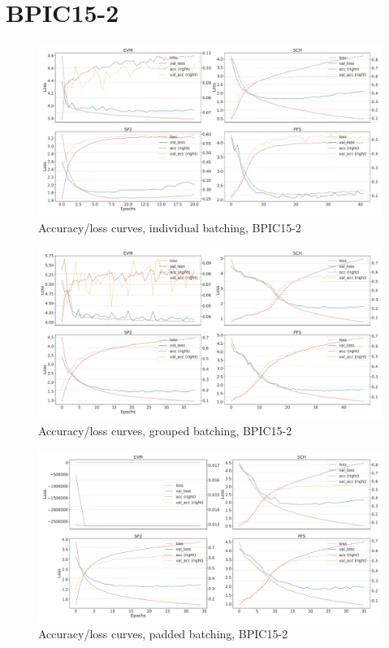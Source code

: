 \section*{BPIC15-2}
\begin{figure}[!htb]
    \centering
    \includegraphics[width=\textwidth]{gfx/bpic2015_2/individual_loss_acc_curve.pdf}
    \caption{Accuracy/loss curves, individual batching, BPIC15-2}
\end{figure}
\begin{figure}[!htb]
    \centering
    \includegraphics[width=\textwidth]{gfx/bpic2015_2/grouped_loss_acc_curve.pdf}
    \caption{Accuracy/loss curves, grouped batching, BPIC15-2}
\end{figure}
\begin{figure}[!htb]
    \centering
    \includegraphics[width=\textwidth]{gfx/bpic2015_2/padded_loss_acc_curve.pdf}
    \caption{Accuracy/loss curves, padded batching, BPIC15-2}
\end{figure}
